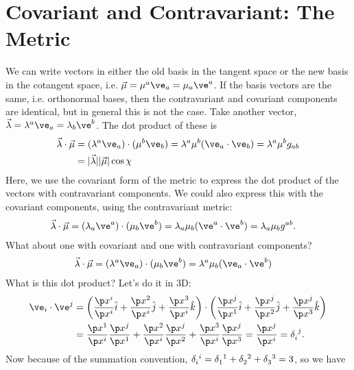 \documentclass[a4paper, 11pt, normalem]{report}
\begin{document}
\section{Covariant and Contravariant: The Metric}
We can write vectors in either the old basis in the tangent space or the new basis in the cotangent space, i.e. $\vec{\mu}=\mu^a\ve_a=\mu_a\ve^a$.
If the basis vectors are the same, i.e. orthonormal bases, then the contravariant and covariant components are identical, but in general this is not the case. 
Take another vector, $\vec{\lambda}=\lambda^a\ve_a=\lambda_b\ve^b$.
The dot product of these is
\begin{align}
    \begin{split}
        \vec{\lambda}\cdot\vec{\mu} &= (\lambda^a\ve_a)\cdot(\mu^b\ve_b) = \lambda^a\mu^b(\ve_a\cdot\ve_b) = \lambda^a\mu^bg_{ab} \\
                                    &= |\vec{\lambda}||\vec{\mu}|\cos\chi
    \end{split}
\end{align}
Here, we use the covariant form of the metric to express the dot product of the vectors with contravariant components.
We could also express this with the covariant components, using the contravariant metric:
\begin{align}
    \vec{\lambda}\cdot\vec{\mu} &= (\lambda_a\ve^a)\cdot(\mu_b\ve^b) = \lambda_a\mu_b(\ve^a\cdot\ve^b) = \lambda_a\mu_bg^{ab}.
\end{align}
What about one with covariant and one with contravariant components?
\begin{align}
    \vec{\lambda}\cdot\vec{\mu} &= (\lambda^a\ve_a)\cdot(\mu_b\ve^b) = \lambda^a\mu_b(\ve_a\cdot\ve^b)
\end{align}
What is this dot product?
Let's do it in 3D:
\begin{align}
    \begin{split}
        \ve_i\cdot\ve^j &= \left(\frac{\p x^i}{\p x^i}\hat{i} + \frac{\p x^2}{\p x^i}\hat{j} + \frac{\p x^3}{\p x^i}\hat{k}\right)\cdot\left(\frac{\p x^j}{\p x^1}\hat{i}+\frac{\p x^j}{\p x^2}\hat{j}+\frac{\p x^j}{\p x^3}\hat{k}\right) \\
                        &= \frac{\p x^1}{\p x^i}\frac{\p x^j}{\p x^1} + \frac{\p x^2}{\p x^i}\frac{\p x^j}{\p x^2} + \frac{\p x^3}{\p x^i}\frac{\p x^j}{\p x^3} = \frac{\p x^j}{\p x^i} = \tensor{\delta}{_i^j}.
    \end{split}
\end{align}
Now because of the summation convention, $\tensor{\delta}{_i^i}=\tensor{\delta}{_1^1}+\tensor{\delta}{_2^2}+\tensor{\delta}{_3^3}=3$, so we have
\end{document}
